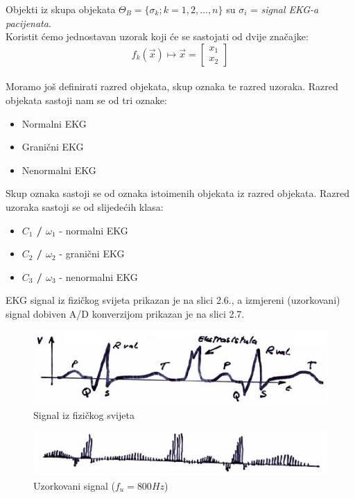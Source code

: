 \documentclass{book}
\begin{document}
Objekti iz skupa objekata $\Theta_B = \{ \sigma_k; k=1,2, \ldots, n \}$ su
$\sigma_i$ = \textit{signal EKG-a pacijenata}. \\

Koristit ćemo jednostavan uzorak koji će se sastojati od dvije značajke: 
$$ f_k(\vec{x}) \longmapsto \vec{x} = \begin{bmatrix}
x_1 \\
x_2
\end{bmatrix} $$ \\

Moramo još definirati razred objekata, skup oznaka te razred uzoraka. Razred
objekata sastoji nam se od tri oznake:
\begin{itemize}
  \item Normalni EKG
  \item Granični EKG 
  \item Nenormalni EKG
\end{itemize}

Skup oznaka sastoji se od oznaka istoimenih objekata iz razred objekata. Razred
uzoraka sastoji se od slijedećih klasa:
\begin{itemize}
  \item \textbf{ $C_1$ / $\omega_1$} - normalni EKG
  \item \textbf{ $C_2$ / $\omega_2$} - granični EKG
  \item \textbf{ $C_3$ / $\omega_3$} - nenormalni EKG \\
\end{itemize}

EKG signal iz fizičkog svijeta prikazan je na slici 2.6., a izmjereni
(uzorkovani) signal dobiven A/D konverzijom prikazan je na slici 2.7. 

\begin{figure}[H]
 \begin{center}
 \includegraphics[scale=0.5]{./pics/EKGsignal}
 \caption{Signal iz fizičkog svijeta}
 \end{center}
 \end{figure}

\begin{figure}[H]
 \begin{center}
 \includegraphics[scale=0.5]{./pics/EKGsignal_uzorkovan}
 \caption{Uzorkovani signal ($f_u = 800 Hz$)}
 \end{center}
 \end{figure}
 
\end{document}

